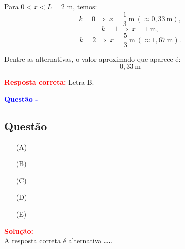 \begin{flushleft}
Para $0 < x < L = 2$ m, temos:
\[
k = 0 \ \Rightarrow \ x = \frac{1}{3} \ \text{m} \ (\approx 0,33 \ \text{m}),
\]
\[
k = 1 \ \Rightarrow \ x = 1 \ \text{m},
\]
\[
k = 2 \ \Rightarrow \ x = \frac{5}{3} \ \text{m} \ (\approx 1,67 \ \text{m}).
\]

Dentre as alternativas, o valor aproximado que aparece é:
\[
\boxed{0,33 \ \text{m}}
\]

\textcolor{red}{\textbf{Resposta correta:}} Letra B.

\end{flushleft}

\begin{flushleft}
\textbf{\textcolor{blue}{\Large Quest\~ao - }}\\
\noindent

\subsection{Quest\~ao }

\begin{itemize}
\item[(A)] 
\item[(B)] 
\item[(C)]
\item[(D)] 
\item[(E)] 
\end{itemize}

\vspace{0.5cm}

\textcolor{red}{\textbf{Solução:}}\\


A resposta correta é alternativa \colorbox{green!50}{\textbf{...}}.

\end{flushleft}